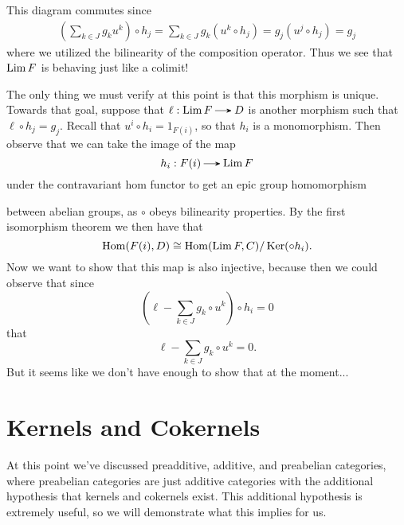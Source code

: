\begin{prf}
    \begin{center}
    \end{center}
    This diagram commutes since 
    \begin{align*}
        \left( \sum_{k \in J}g_ku^k \right) \circ h_j
        =
        \sum_{k \in J}g_k(u^k \circ h_j)
        =
        g_j(u^j \circ h_j)
        = g_j 
    \end{align*}
    where we utilized the bilinearity of the composition operator.
    Thus we see that $\operatorname*{\mathrm{Lim }} F$ is behaving just like a colimit! 
    
    The only thing we 
    must verify at this point is that this morphism is unique. Towards that goal, 
    suppose that $\ell: \Lim F \to D$ is another morphism such that 
    $\ell \circ h_j = g_j$. Recall that $u^i\circ h_i= 1_{F(i)}$, 
    so that $h_i$ is a monomorphism. Then observe that we can take 
    the image of the map 
    \[
       h_i: F(i) \to \Lim F  
    \]
    under the contravariant hom functor to get an epic group homomorphism 
    \begin{center}
    \end{center}
    between abelian groups, as $\circ$ obeys bilinearity 
    properties. By the first isomorphism theorem we then have that 
    \[
        \operatorname{\mathrm{Hom}}(F(i), D) \cong \operatorname{\mathrm{Hom}}(\operatorname*{\mathrm{Lim }} F, C)/\operatorname{\mathrm{Ker}}(\circ h_i).
    \]
    Now we want to show that this map is also injective, because then 
    we could observe that since
    \[
        \left(\ell - \sum_{k \in J}g_k \circ u^k\right)\circ h_i = 0
    \]
    that 
    \[
        \ell - \sum_{k \in J}g_k \circ u^k = 0.
    \]
    But it seems like we don't have enough to show that at the moment...

\end{prf}

\newpage
\section{Kernels and Cokernels}
At this point we've discussed preadditive, additive, and preabelian categories, where 
preabelian categories are just additive categories with the additional hypothesis 
that kernels and cokernels exist. This additional hypothesis is extremely useful, 
so we will demonstrate what this implies for us. 

